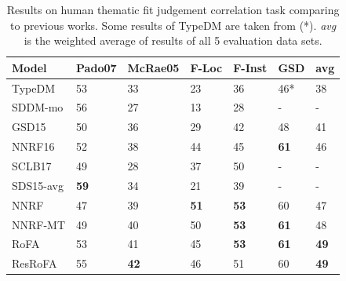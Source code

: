 \documentclass[a4paper]{article}
\begin{document}
\begin{table}[t]
\centering
\begin{tabular}{l|lllll|l}
\textbf{Model} & Pado07 & McRae05 & F-Loc   & F-Inst        &   GSD       &   avg     \\ \hline  \hline 
TypeDM  &   53      &   33      &   23      &   36          &   46*       &   38      \\ 
SDDM-mo &   56      &   27      &   13      &   28          &   -         &   -       \\ 
GSD15   &   50      &   36      &   29      &   42          &   48        &   41      \\
NNRF16  &   52      &   38      &   44      &   45          & \textbf{61} &   46      \\  
SCLB17  &   49      &   28      &   37      &   50          &   -         &   -       \\  \hline 
SDS15-avg&\textbf{59}&  34      &   21      &   39          &   -         &   -       \\ \hline  \hline 
NNRF    &   47      &   39      &\textbf{51}&   \textbf{53} &   60        &   47      \\
NNRF-MT &   49      &   40      &   50      &   \textbf{53} & \textbf{61} &   48      \\
RoFA     &   53      &  41    & 45        &  \textbf{53} & \textbf{61}  &\textbf{49}\\
ResRoFA  &   55      & \textbf{42} & 46     &   51         &   60         &\textbf{49}\\
\end{tabular}
\caption{\label{tab:eval-thematic} Results on human thematic fit judgement correlation task comparing to previous works. Some results of TypeDM are taken from \citet{greenberg2015verb}(*). \textit{avg} is the weighted average of results of all 5 evaluation data sets. }
\end{table}
\end{document}
